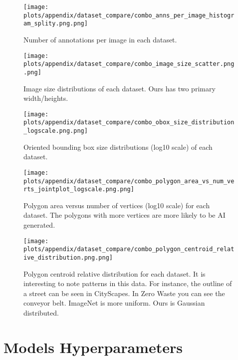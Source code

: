 \begin{figure*}[ht]
\centering
\texttt{[image: plots/appendix/dataset\_compare/combo\_anns\_per\_image\_histogram\_splity.png.png]}
\caption[]{
    Number of annotations per image in each dataset.
}
\label{fig:combo_anns_per_image_histogram_splity}
\end{figure*}


\begin{figure*}[ht]
\centering
\texttt{[image: plots/appendix/dataset\_compare/combo\_image\_size\_scatter.png.png]}
\caption[]{
    Image size distributions of each dataset. 
    Ours has two primary width/heights.
}
\label{fig:combo_image_size_scatter}
\end{figure*}


\begin{figure*}[ht]
\centering
\texttt{[image: plots/appendix/dataset\_compare/combo\_obox\_size\_distribution\_logscale.png.png]}
\caption[]{
    Oriented bounding box size distributions (log10 scale) of each dataset.
}
\label{fig:combo_obox_size_distribution_logscale}
\end{figure*}

\begin{figure*}[ht]
\centering
\texttt{[image: plots/appendix/dataset\_compare/combo\_polygon\_area\_vs\_num\_verts\_jointplot\_logscale.png.png]}
\caption[]{
    Polygon area versus number of vertices (log10 scale) for each dataset.
    The polygons with more vertices are more likely to be AI generated.
}
\label{fig:combo_polygon_area_vs_num_verts_jointplot}
\end{figure*}

\begin{figure*}[ht]
\centering
\texttt{[image: plots/appendix/dataset\_compare/combo\_polygon\_centroid\_relative\_distribution.png.png]}
\caption[]{
    Polygon centroid relative distribution for each dataset. It is interesting
    to note patterns in this data. For instance, the outline of a street can be
    seen in CityScapes. In Zero Waste you can see the conveyor belt. ImageNet
    is more uniform. Ours is Gaussian distributed. 
}
\label{fig:combo_polygon_centroid_relative_distribution}
\end{figure*}


\section{Models Hyperparameters}
\label{sec:model_hyperparams}

